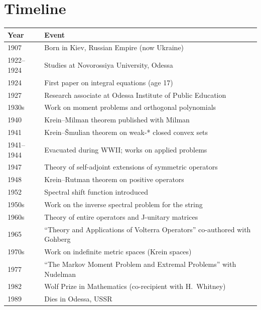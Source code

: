 \section*{Timeline}

\begin{tabularx}{\linewidth}{|p{1.5cm}|>{\raggedright\arraybackslash}X|}
\hline
\textbf{Year} & \textbf{Event} \\ \hline
1907 & Born in Kiev, Russian Empire (now Ukraine) \\ \hline
1922--1924 & Studies at Novorossiya University, Odessa \\ \hline
1924 & First paper on integral equations (age 17) \\ \hline
1927 & Research associate at Odessa Institute of Public Education \\ \hline
1930s & Work on moment problems and orthogonal polynomials \\ \hline
1940 & Krein--Milman theorem published with Milman \\ \hline
1941 & Krein--{\v S}mulian theorem on weak-* closed convex sets \\ \hline
1941--1944 & Evacuated during WWII; works on applied problems \\ \hline
1947 & Theory of self-adjoint extensions of symmetric operators \\ \hline
1948 & Krein--Rutman theorem on positive operators \\ \hline
1952 & Spectral shift function introduced \\ \hline
1950s & Work on the inverse spectral problem for the string \\ \hline
1960s & Theory of entire operators and J-unitary matrices \\ \hline
1965 & ``Theory and Applications of Volterra Operators'' co-authored with Gohberg \\ \hline
1970s & Work on indefinite metric spaces (Krein spaces) \\ \hline
1977 & ``The Markov Moment Problem and Extremal Problems'' with Nudelman \\ \hline
1982 & Wolf Prize in Mathematics (co-recipient with H.\ Whitney) \\ \hline
1989 & Dies in Odessa, USSR \\ \hline
\end{tabularx}
